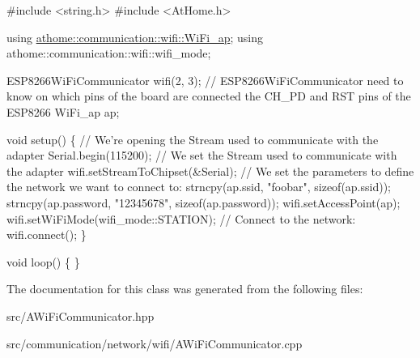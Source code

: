 \begin{DoxyCode}
\textcolor{preprocessor}{#include <string.h>}
\textcolor{preprocessor}{#include <AtHome.h>}

\textcolor{keyword}{using} \mbox{\hyperlink{structathome_1_1communication_1_1wifi_1_1s__wifi__access__point}{athome::communication::wifi::WiFi\_ap}};
\textcolor{keyword}{using} athome::communication::wifi::wifi\_mode;

ESP8266WiFiCommunicator wifi(2, 3); \textcolor{comment}{// ESP8266WiFiCommunicator need to know on which pins of the board are
       connected the CH\_PD and RST pins of the ESP8266}
WiFi\_ap ap;

\textcolor{keywordtype}{void} setup() \{
  \textcolor{comment}{// We're opening the Stream used to communicate with the adapter}
  Serial.begin(115200);
  \textcolor{comment}{// We set the Stream used to communicate with the adapter}
  wifi.setStreamToChipset(&Serial);
  \textcolor{comment}{// We set the parameters to define the network we want to connect to:}
  strncpy(ap.ssid, \textcolor{stringliteral}{"foobar"}, \textcolor{keyword}{sizeof}(ap.ssid));
  strncpy(ap.password, \textcolor{stringliteral}{"12345678"}, \textcolor{keyword}{sizeof}(ap.password));
  wifi.setAccessPoint(ap);
  wifi.setWiFiMode(wifi\_mode::STATION);
  \textcolor{comment}{// Connect to the network:}
  wifi.connect();
\}

\textcolor{keywordtype}{void} loop() \{
\}
\end{DoxyCode}
 

The documentation for this class was generated from the following files\+:\begin{DoxyCompactItemize}
\item 
src/A\+Wi\+Fi\+Communicator.\+hpp\item 
src/communication/network/wifi/A\+Wi\+Fi\+Communicator.\+cpp\end{DoxyCompactItemize}
